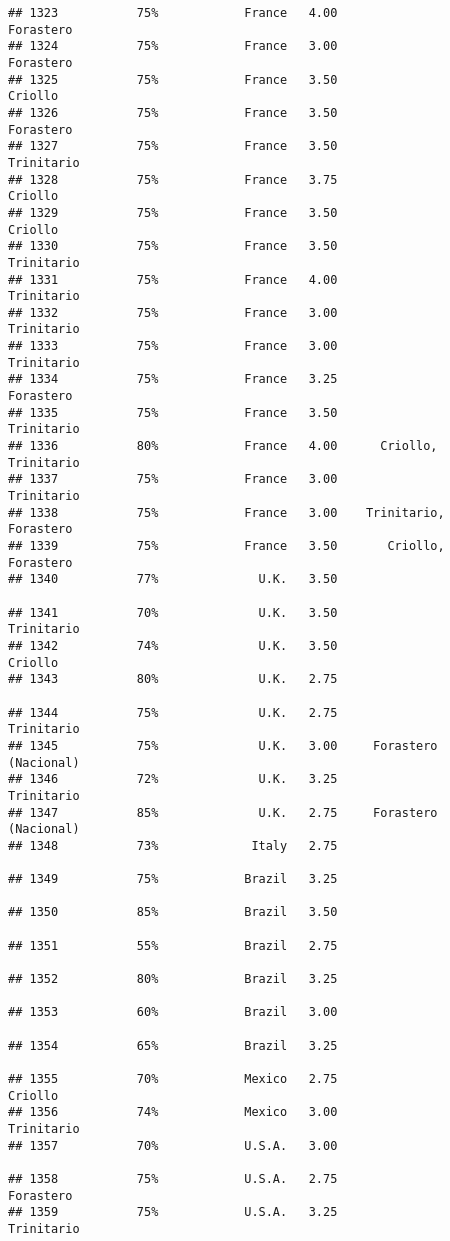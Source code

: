 \documentclass[
]{article}
\begin{document}
\begin{verbatim}
## 1323           75%            France   4.00                Forastero
## 1324           75%            France   3.00                Forastero
## 1325           75%            France   3.50                  Criollo
## 1326           75%            France   3.50                Forastero
## 1327           75%            France   3.50               Trinitario
## 1328           75%            France   3.75                  Criollo
## 1329           75%            France   3.50                  Criollo
## 1330           75%            France   3.50               Trinitario
## 1331           75%            France   4.00               Trinitario
## 1332           75%            France   3.00               Trinitario
## 1333           75%            France   3.00               Trinitario
## 1334           75%            France   3.25                Forastero
## 1335           75%            France   3.50               Trinitario
## 1336           80%            France   4.00      Criollo, Trinitario
## 1337           75%            France   3.00               Trinitario
## 1338           75%            France   3.00    Trinitario, Forastero
## 1339           75%            France   3.50       Criollo, Forastero
## 1340           77%              U.K.   3.50                         
## 1341           70%              U.K.   3.50               Trinitario
## 1342           74%              U.K.   3.50                  Criollo
## 1343           80%              U.K.   2.75                         
## 1344           75%              U.K.   2.75               Trinitario
## 1345           75%              U.K.   3.00     Forastero (Nacional)
## 1346           72%              U.K.   3.25               Trinitario
## 1347           85%              U.K.   2.75     Forastero (Nacional)
## 1348           73%             Italy   2.75                         
## 1349           75%            Brazil   3.25                         
## 1350           85%            Brazil   3.50                         
## 1351           55%            Brazil   2.75                         
## 1352           80%            Brazil   3.25                         
## 1353           60%            Brazil   3.00                         
## 1354           65%            Brazil   3.25                         
## 1355           70%            Mexico   2.75                  Criollo
## 1356           74%            Mexico   3.00               Trinitario
## 1357           70%            U.S.A.   3.00                         
## 1358           75%            U.S.A.   2.75                Forastero
## 1359           75%            U.S.A.   3.25               Trinitario

\end{verbatim}
\end{document}
